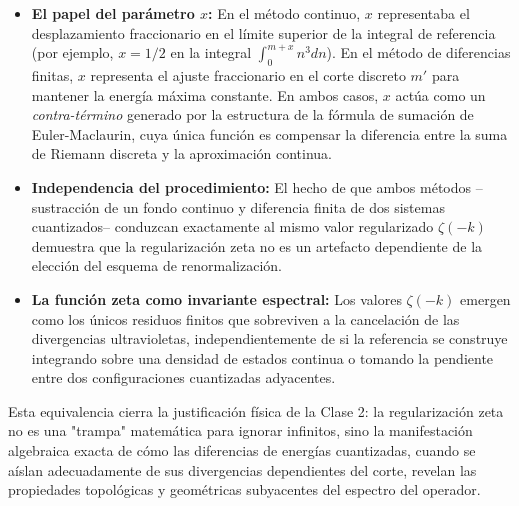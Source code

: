 \begin{itemize}
    \item \textbf{El papel del parámetro $x$:} En el método continuo, $x$ representaba el desplazamiento fraccionario en el límite superior de la integral de referencia (por ejemplo, $x=1/2$ en la integral $\int_0^{m+x} n^3 dn$). En el método de diferencias finitas, $x$ representa el ajuste fraccionario en el corte discreto $m'$ para mantener la energía máxima constante. En ambos casos, $x$ actúa como un \textit{contra-término} generado por la estructura de la fórmula de sumación de Euler-Maclaurin, cuya única función es compensar la diferencia entre la suma de Riemann discreta y la aproximación continua.
    \item \textbf{Independencia del procedimiento:} El hecho de que ambos métodos --sustracción de un fondo continuo y diferencia finita de dos sistemas cuantizados-- conduzcan exactamente al mismo valor regularizado $\zeta(-k)$ demuestra que la regularización zeta no es un artefacto dependiente de la elección del esquema de renormalización. 
    \item \textbf{La función zeta como invariante espectral:} Los valores $\zeta(-k)$ emergen como los únicos residuos finitos que sobreviven a la cancelación de las divergencias ultravioletas, independientemente de si la referencia se construye integrando sobre una densidad de estados continua o tomando la pendiente entre dos configuraciones cuantizadas adyacentes.
\end{itemize}

Esta equivalencia cierra la justificación física de la Clase 2: la regularización zeta no es una "trampa" matemática para ignorar infinitos, sino la manifestación algebraica exacta de cómo las diferencias de energías cuantizadas, cuando se aíslan adecuadamente de sus divergencias dependientes del corte, revelan las propiedades topológicas y geométricas subyacentes del espectro del operador.